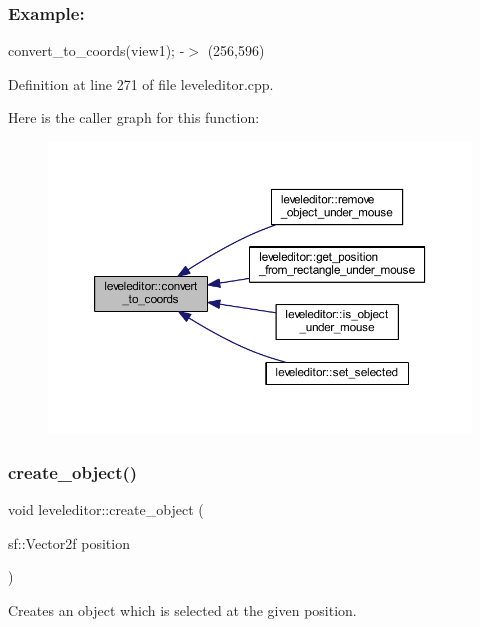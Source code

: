 \subsubsection*{Example\+: }

convert\+\_\+to\+\_\+coords(view1); -\/$>$ (256,596) 

Definition at line 271 of file leveleditor.\+cpp.

Here is the caller graph for this function\+:
\nopagebreak
\begin{figure}[H]
\begin{center}
\leavevmode
\includegraphics[width=350pt]{classleveleditor_ac2de1ac26fa5f7e10ca834e6448b1b6b_icgraph}
\end{center}
\end{figure}
\mbox{\label{classleveleditor_a3d09ece44892be49f42c62b3cdcada0c}} 
\subsubsection{\texorpdfstring{create\+\_\+object()}{create\_object()}}
{\footnotesize\ttfamily void leveleditor\+::create\+\_\+object (\begin{DoxyParamCaption}\item[{sf\+::\+Vector2f}]{position }\end{DoxyParamCaption})\hspace{0.3cm}{\ttfamily [private]}}



Creates an object which is selected at the given position. 

